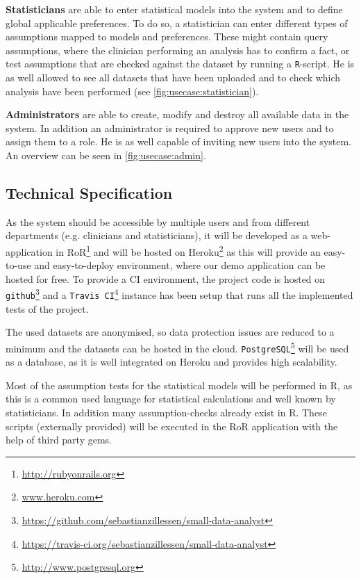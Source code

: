\textbf{Statisticians} are able to enter statistical models into the system and to define global applicable preferences. To do so, a statistician can enter different types of assumptions mapped to models and preferences. These might contain query assumptions, where the clinician performing an analysis has to confirm a fact, or test assumptions that are checked against the dataset by running a \texttt{R}-script. He is as well allowed to see all datasets that have been uploaded and to check which analysis have been performed (see \autoref{fig:usecase:statistician}).



\textbf{Administrators} are able to create, modify and destroy all available data in the system. In addition an administrator is required to approve new users and to assign them to a role. He is as well capable of inviting new users into the system. An overview can be seen in \autoref{fig:usecase:admin}.



\subsection{Technical Specification}
\label{sub:technical}

As the system should be accessible by multiple users and from different departments (e.g. clinicians and statisticians), it will be developed as a web-application in \gls{RoR}\footnote{\href{http://rubyonrails.org}{http://rubyonrails.org}} and will be hosted on Heroku\footnote{\href{https://www.heroku.com}{www.heroku.com}} as this will provide an easy-to-use and easy-to-deploy environment, where our demo application can be hosted for free. To provide a \gls{CI} environment, the project code is hosted on \texttt{github}\footnote{\href{https://github.com/sebastianzillessen/small-data-analyst}{https://github.com/sebastianzillessen/small-data-analyst}} and a \texttt{Travis CI}\footnote{\href{https://travis-ci.org/sebastianzillessen/small-data-analyst}{https://travis-ci.org/sebastianzillessen/small-data-analyst} } instance has been setup that runs all the implemented tests of the project.

The used datasets are anonymised, so data protection issues are reduced to a minimum and the datasets can be hosted in the cloud. \texttt{PostgreSQL}\footnote{\href{http://www.postgresql.org}{http://www.postgresql.org}} will be used as a database, as it is well integrated on Heroku and provides high scalability.

Most of the assumption tests for the statistical models will be performed in \gls{R}, as this is a common used language for statistical calculations and well known by statisticians. In addition many assumption-checks already exist in \gls{R}. These scripts (externally provided) will be executed in the \gls{RoR} application with the help of third party gems.

